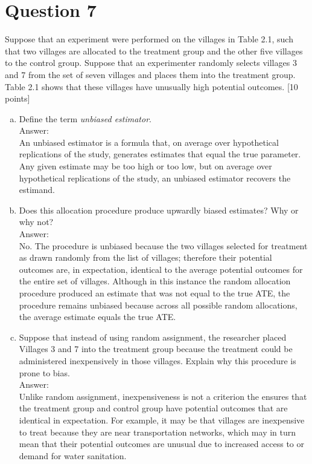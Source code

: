 \documentclass[11pt,notitlepage]{article}\usepackage[]{graphicx}\usepackage[]{color}
\begin{document}
\section*{Question 7}
Suppose that an experiment were performed on the villages in Table 2.1, such that two villages are allocated to the treatment group and the other five villages to the control group. Suppose that an experimenter randomly selects villages 3 and 7 from the set of seven villages and places them into the treatment group.  Table 2.1 shows that these villages have unusually high potential outcomes. [10 points]
\begin{enumerate}[a)]
\item Define the term \textit{unbiased estimator}.\\
Answer:\\
An unbiased estimator is a formula that, on average over hypothetical replications of the study, generates estimates that equal the true parameter. Any given estimate may be too high or too low, but on average over hypothetical replications of the study, an unbiased estimator recovers the estimand.
\item Does this allocation procedure produce upwardly biased estimates?  Why or why not? \\
Answer:\\
No.  The procedure is unbiased because the two villages selected for treatment as drawn randomly from the list of villages; therefore their potential outcomes are, in expectation, identical to the average potential outcomes for the entire set of villages.  Although in this instance the random allocation procedure produced an estimate that was not equal to the true ATE, the procedure remains unbiased because across all possible random allocations, the average estimate equals the true ATE.
\item Suppose that instead of using random assignment, the researcher placed Villages 3 and 7 into the treatment group because the treatment could be administered inexpensively in those villages.  Explain why this procedure is prone to bias. \\
Answer:\\
Unlike random assignment, inexpensiveness is not a criterion the ensures that the treatment group and control group have potential outcomes that are identical in expectation. For example, it may be that villages are inexpensive to treat because they are near transportation networks, which may in turn mean that their potential outcomes are unusual due to increased access to or demand for water sanitation.
\end{enumerate}
\end{document}
